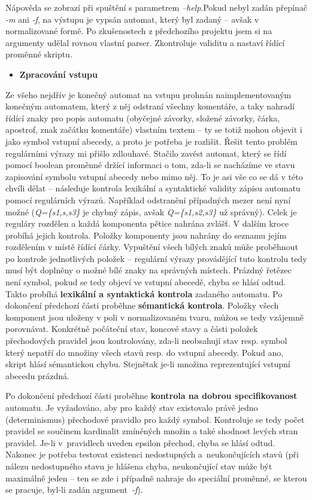 \documentclass[11pt,a4paper]{article}
\begin{document}
\noindent Nápověda se zobrazí při spuštění s parametrem \emph{--help}.Pokud nebyl zadán přepínač \emph{-m} ani \emph{-f}, na výstupu je vypsán automat, který byl zadaný -- avšak v normalizované formě. Po zkušenostech z předchozího projektu jsem si na argumenty udělal rovnou vlastní parser. Zkontroluje validitu a nastaví řídící proměnné skriptu.


\begin{itemize}[leftmargin=0cm]
\item{\textbf{Zpracování vstupu}}
\end{itemize}
Ze všeho nejdřív je konečný automat na vstupu prohnán naimplementovaným konečným automatem, který z něj odstraní všechny komentáře, a taky nahradí řídící znaky pro popis automatu (obyčejné závorky, složené závorky, čárka, apostrof, znak začátku komentáře) vlastním textem -- ty se totiž mohou objevit i jako symbol vstupní abecedy, a proto je potřeba je rozlišit. Řešit tento problém regulárními výrazy mi přišlo zdlouhavé. Stačilo zavést automat, který se řídí pomocí boolean proměnné držící informaci o tom, zda-li se nacházíme ve stavu zapisování symbolu vstupní abecedy nebo mimo něj. To je asi vše co se dá v této chvíli dělat -- následuje kontrola lexikální a syntaktické validity zápisu automatu pomocí regulárních výrazů. Například odstranění případných mezer není nyní možné (\emph{Q=\{s1,s,s3\}} je chybný zápis, avšak \emph{Q=\{s1,s2,s3\}} už správný). Celek je reguláry rozdělen a každá komponenta pětice nahrána zvlášť. V dalším kroce probíhá jejich kontrola. Položky komponenty jsou nahrány do seznamu jejím rozdělením v místě řídící čárky. Vypuštění všech bílých znaků může proběhnout po kontrole jednotlivých položek -- regulární výrazy provádějící tuto kontrolu tedy musí být doplněny o možné bílé znaky na správných místech. Prázdný řetězec není symbol, pokud se tedy objeví ve vstupní abecedě, chyba se hlásí odtud. Takto probíhá \textbf{lexikální a syntaktická kontrola} zadaného automatu.
\newpage
\bigskip
Po dokončení předchozí části proběhne \textbf{sémantická kontrola}. Položky všech komponent jsou uloženy v poli v normalizovaném tvaru, můžou se tedy vzájemně porovnávat. Konkrétně počáteční stav, koncové stavy a části položek přechodových pravidel jsou kontrolovány, zda-li neobsahují stav resp. symbol který nepatří do množiny všech stavů resp. do vstupní abecedy. Pokud ano, skript hlásí sémantickou chybu. Stejnětak je-li množina reprezentující vstupní abecedu prázdná.

Po dokončení předchozí části proběhne \textbf{kontrola na dobrou specifikovanost} automatu. Je vyžadováno, aby pro každý stav existovalo právě jedno (determinismus) přechodové pravidlo pro každý symbol. Kontroluje se tedy počet pravidel se součinem kardinalit zmíněných množin a také shodnost levých stran pravidel. Je-li v~pravidlech uveden epsilon přechod, chyba se hlásí odtud. Nakonec je potřeba testovat existenci nedostupných a~neukončujících stavů (při nálezu nedostupného stavu je hlášena chyba, neukončující stav může být maximálně jeden -- ten se zde i případně nahraje do speciální proměnné, se kterou se pracuje, byl-li zadán argument~\emph{-f}).
\end{document}
